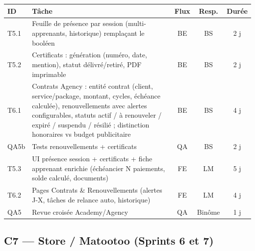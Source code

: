 \documentclass[11pt,a4paper]{article}
\begin{document}
\begin{tabularx}{\textwidth}{|l|Y|c|c|c|}
\hline
{}\textbf{ID} & \textbf{Tâche} & \textbf{Flux} & \textbf{Resp.} & \textbf{Durée} \\ \hline
T5.1 & Feuille de présence par session (multi-apprenants, historique) remplaçant le booléen & BE & BS & 2 j \\ \hline
T5.2 & Certificats : génération (numéro, date, mention), statut délivré/retiré, PDF imprimable & BE & BS & 2 j \\ \hline
T6.1 & Contrats Agency : entité contrat (client, service/package, montant, cycles, échéance calculée), renouvellements avec alertes configurables, statuts actif / à renouveler / expiré / suspendu / résilié ; distinction honoraires vs budget publicitaire & BE & BS & 4 j \\ \hline
QA5b & Tests renouvellements + certificats & QA & BS & 2 j \\ \hline
T5.3 & UI présence session + certificats + fiche apprenant enrichie (échéancier N paiements, solde calculé, documents) & FE & LM & 5 j \\ \hline
T6.2 & Pages Contrats \& Renouvellements (alertes J-X, tâches de relance auto, historique) & FE & LM & 4 j \\ \hline
QA5 & Revue croisée Academy/Agency & QA & Binôme & 1 j \\ \hline
\end{tabularx}

\subsection{C7 --- Store / Matootoo (Sprints 6 et 7)}
\end{document}
